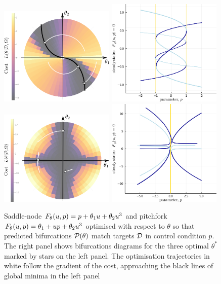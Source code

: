 \documentclass{article}
\begin{document}
\begin{figure}[ht]
\centering
\includegraphics[width=5.5cm]{saddle-landscape.png}
\includegraphics[width=5.5cm]{saddle-optima.png}
\includegraphics[width=5.5cm]{pitchfork-landscape.png}
\includegraphics[width=5.5cm]{pitchfork-optima.png}
\caption{Saddle-node $F_{\theta}(u,p) = p + \theta_{1}u+\theta_{2}u^3$ and pitchfork $F_{\theta}(u,p) = \theta_{1} + u p +\theta_{2}u^3$ optimised with respect to $\theta$ so that predicted bifurcations $\mathcal{P}(\theta)$ match targets $\mathcal{D}$ in control condition $p$. The right panel shows bifurcations diagrams for the three optimal $\theta^*$ marked by stars on the left panel. The optimisation trajectories in white follow the gradient of the cost, approaching the black lines of global minima in the left panel}
\label{fig:minimal-models:results}
\end{figure}
\end{document}
